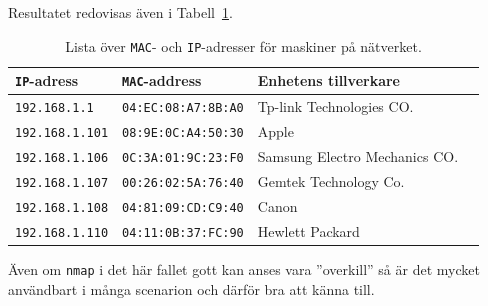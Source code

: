 Resultatet redovisas även i Tabell~\ref{table:network}.

\begin{table}[]
  \centering
  \caption{Lista över \texttt{MAC}- och \texttt{IP}-adresser för maskiner på
           nätverket.}
  \label{table:network}
  \begin{tabular}{@{}llll@{}}
    \toprule
    \texttt{IP}-adress     & \texttt{MAC}-address       & Enhetens tillverkare          \\ \midrule
    \texttt{192.168.1.1}   & \texttt{04:EC:08:A7:8B:A0} & Tp-link Technologies CO.      \\
    \texttt{192.168.1.101} & \texttt{08:9E:0C:A4:50:30} & Apple                         \\
    \texttt{192.168.1.106} & \texttt{0C:3A:01:9C:23:F0} & Samsung Electro Mechanics CO. \\
    \texttt{192.168.1.107} & \texttt{00:26:02:5A:76:40} & Gemtek Technology Co.         \\
    \texttt{192.168.1.108} & \texttt{04:81:09:CD:C9:40} & Canon                         \\
    \texttt{192.168.1.110} & \texttt{04:11:0B:37:FC:90} & Hewlett Packard               \\ \bottomrule
  \end{tabular}
\end{table}


Även om \texttt{nmap} i det här fallet gott kan anses vara ''overkill'' så är
det mycket användbart i många scenarion och därför bra att känna till.

